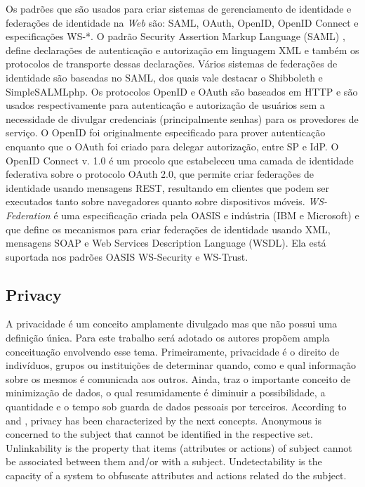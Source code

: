 \documentclass{doublecol-new}
\begin{document}
Os padrões que são usados para criar sistemas de gerenciamento de identidade e federações de identidade na \textit{Web} são:  SAML, OAuth, OpenID, OpenID Connect e especificações WS-*. O padrão Security Assertion Markup Language (SAML) \cite{ragouzis2008security}, define declarações de autenticação e autorização em linguagem XML e também os protocolos de transporte dessas declarações. Vários sistemas de federações de identidade são baseadas no SAML, dos quais vale destacar o Shibboleth \cite{erdos2002shibboleth} e SimpleSALMLphp. Os protocolos OpenID\cite{openid2015} e OAuth\cite{hardt2012oauth} são baseados em HTTP e são usados respectivamente para autenticação e autorização de usuários sem a necessidade de divulgar credenciais (principalmente senhas) para os provedores de serviço. O OpenID foi originalmente especificado para prover autenticação enquanto que o OAuth foi criado para delegar autorização, entre SP e IdP. O OpenID Connect v. 1.0 \cite{sakimura2014openidconnect} é um procolo que estabeleceu uma camada de identidade federativa sobre o protocolo OAuth 2.0, que permite criar federações de identidade usando mensagens REST, resultando em clientes que podem ser executados tanto sobre navegadores quanto sobre dispositivos móveis. \textit{WS-Federation} \cite{goodner2009ws} é uma especificação criada pela OASIS e indústria (IBM e Microsoft) e que define os mecanismos para criar federações de identidade usando XML, mensagens SOAP e Web Services Description Language (WSDL). Ela está suportada nos padrões OASIS WS-Security e WS-Trust.

\subsection[sec:privacy]{Privacy}

A privacidade é um conceito amplamente divulgado mas que não possui uma definição única. Para este trabalho será adotado os autores \cite{pfitzmann2010terminology} propõem ampla conceituação envolvendo esse tema. Primeiramente, privacidade é o direito de indivíduos, grupos ou instituições de determinar quando, como e qual informação sobre os mesmos é comunicada aos outros. Ainda, traz o importante conceito de minimização de dados, o qual resumidamente é diminuir a possibilidade, a quantidade e o tempo sob guarda de dados pessoais por terceiros. According to \cite{pfitzmann2010terminology} and  \cite{deng2011privacy}, privacy has been characterized by the next concepts. Anonymous is concerned to the subject that cannot be identified in the respective set. Unlinkability is the property that items (attributes or actions) of subject cannot be associated between them and/or with a subject. Undetectability is the capacity of a system to obfuscate attributes and actions related do the subject.
\end{document}

